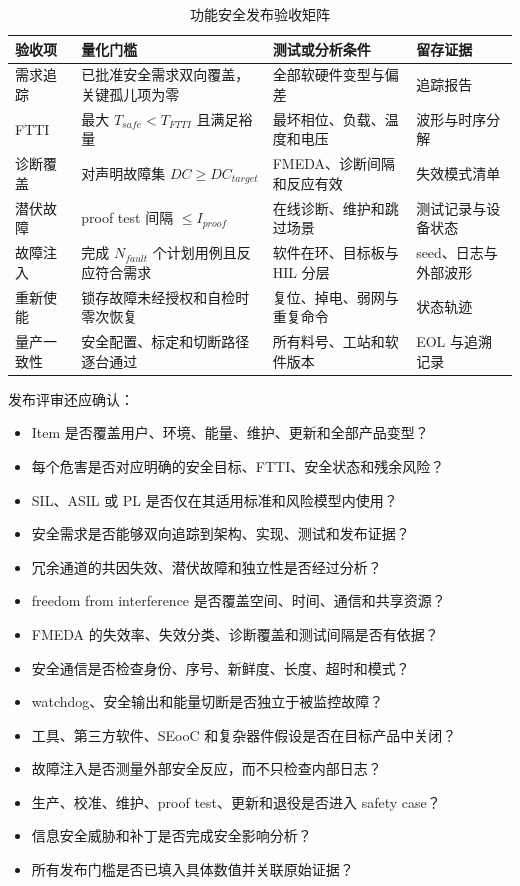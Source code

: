 \begin{table}[H]
  \centering
  \caption{功能安全发布验收矩阵}
  \begin{tabular}{p{28mm}p{40mm}p{41mm}p{27mm}}
    \hline
    验收项 & 量化门槛 & 测试或分析条件 & 留存证据 \\
    \hline
    需求追踪 & 已批准安全需求双向覆盖，关键孤儿项为零 & 全部软硬件变型与偏差 & 追踪报告 \\
    FTTI & 最大 $T_{safe}<T_{FTTI}$ 且满足裕量 & 最坏相位、负载、温度和电压 & 波形与时序分解 \\
    诊断覆盖 & 对声明故障集 $DC\geq DC_{target}$ & FMEDA、诊断间隔和反应有效 & 失效模式清单 \\
    潜伏故障 & proof test 间隔 $\leq I_{proof}$ & 在线诊断、维护和跳过场景 & 测试记录与设备状态 \\
    故障注入 & 完成 $N_{fault}$ 个计划用例且反应符合需求 & 软件在环、目标板与 HIL 分层 & seed、日志与外部波形 \\
    重新使能 & 锁存故障未经授权和自检时零次恢复 & 复位、掉电、弱网与重复命令 & 状态轨迹 \\
    量产一致性 & 安全配置、标定和切断路径逐台通过 & 所有料号、工站和软件版本 & EOL 与追溯记录 \\
    \hline
  \end{tabular}
\end{table}

发布评审还应确认：

\begin{itemize}
  \item Item 是否覆盖用户、环境、能量、维护、更新和全部产品变型？
  \item 每个危害是否对应明确的安全目标、FTTI、安全状态和残余风险？
  \item SIL、ASIL 或 PL 是否仅在其适用标准和风险模型内使用？
  \item 安全需求是否能够双向追踪到架构、实现、测试和发布证据？
  \item 冗余通道的共因失效、潜伏故障和独立性是否经过分析？
  \item freedom from interference 是否覆盖空间、时间、通信和共享资源？
  \item FMEDA 的失效率、失效分类、诊断覆盖和测试间隔是否有依据？
  \item 安全通信是否检查身份、序号、新鲜度、长度、超时和模式？
  \item watchdog、安全输出和能量切断是否独立于被监控故障？
  \item 工具、第三方软件、SEooC 和复杂器件假设是否在目标产品中关闭？
  \item 故障注入是否测量外部安全反应，而不只检查内部日志？
  \item 生产、校准、维护、proof test、更新和退役是否进入 safety case？
  \item 信息安全威胁和补丁是否完成安全影响分析？
  \item 所有发布门槛是否已填入具体数值并关联原始证据？
\end{itemize}
